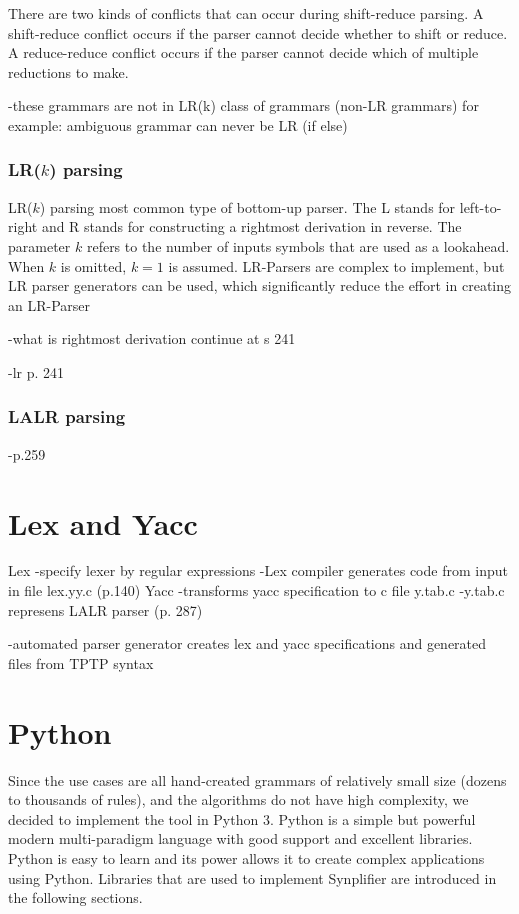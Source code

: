 There are two kinds of conflicts that can occur during shift-reduce parsing. A shift-reduce conflict occurs if the parser cannot decide whether to shift or reduce.
A reduce-reduce conflict occurs if the parser cannot decide which of multiple reductions to make.

-these grammars are not in LR(k) class of grammars (non-LR grammars)
for example: ambiguous grammar can never be LR (if else)
\cite{Aho.2007}

\subsubsection{LR($k$) parsing}\label{sec:BackgroundParserLR}

LR($k$) parsing most common type of bottom-up parser. The L stands for left-to-right and R stands for constructing a rightmost derivation in reverse. The parameter $k$ refers to the number of inputs symbols that are used as a lookahead. When $k$ is omitted, $k = 1$ is assumed.
LR-Parsers are complex to implement, but LR parser generators can be used, which significantly reduce the effort in creating an LR-Parser

-what is rightmost derivation
continue at s 241


\cite{Aho.2007}
-lr p. 241

\subsubsection{LALR parsing}\label{sec:BackgroundParserLALR}

\cite{Aho.2007}
-p.259

\section{Lex and Yacc}\label{sec:BackgroundLexYacc}

Lex
-specify lexer by regular expressions
-Lex compiler generates code from input in file lex.yy.c
(p.140)
Yacc
-transforms yacc specification to c file y.tab.c
-y.tab.c represens LALR parser
(p. 287)
\cite{Aho.2007}

-automated parser generator creates lex and yacc specifications and generated files from \ac{TPTP} syntax

\section{Python}\label{sec:BackgroundPython}

Since the use cases are all hand-created grammars of relatively small
size (dozens to thousands of rules), and the algorithms do not have
high complexity, we decided to implement the tool in Python 3. 
Python
is a simple but powerful modern multi-paradigm language with good support and excellent
libraries. Python is easy to learn and its power allows it to create complex applications using Python. Libraries that are used to implement \ac{Synplifier} are introduced in the following sections.

